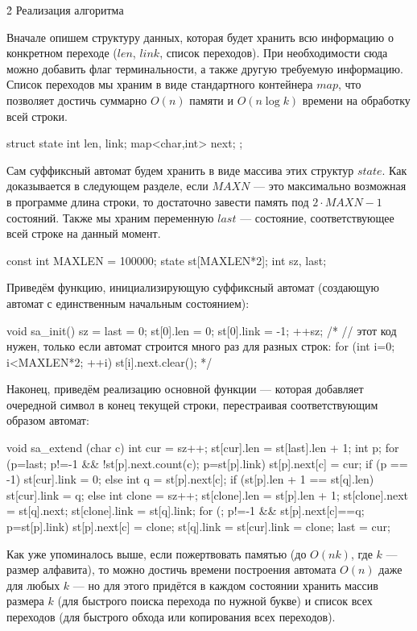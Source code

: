 \h2{ Реализация алгоритма }

Вначале опишем структуру данных, которая будет хранить всю информацию о конкретном переходе ($len$, $link$, список переходов). При необходимости сюда можно добавить флаг терминальности, а также другую требуемую информацию. Список переходов мы храним в виде стандартного контейнера $map$, что позволяет достичь суммарно $O(n)$ памяти и $O (n \log k)$ времени на обработку всей строки.

\code
struct state {
	int len, link;
	map<char,int> next;
};
\endcode

Сам суффиксный автомат будем хранить в виде массива этих структур $state$. Как доказывается в следующем разделе, если $MAXN$ --- это максимально возможная в программе длина строки, то достаточно завести память под $2 \cdot MAXN - 1$ состояний. Также мы храним переменную $last$ --- состояние, соответствующее всей строке на данный момент.

\code
const int MAXLEN = 100000;
state st[MAXLEN*2];
int sz, last;
\endcode

Приведём функцию, инициализирующую суффиксный автомат (создающую автомат с единственным начальным состоянием):

\code
void sa_init() {
	sz = last = 0;
	st[0].len = 0;
	st[0].link = -1;
	++sz;
	/*
	// этот код нужен, только если автомат строится много раз для разных строк:
	for (int i=0; i<MAXLEN*2; ++i)
		st[i].next.clear();
	*/
}
\endcode

Наконец, приведём реализацию основной функции --- которая добавляет очередной символ в конец текущей строки, перестраивая соответствующим образом автомат:

\code
void sa_extend (char c) {
	int cur = sz++;
	st[cur].len = st[last].len + 1;
	int p;
	for (p=last; p!=-1 && !st[p].next.count(c); p=st[p].link)
		st[p].next[c] = cur;
	if (p == -1)
		st[cur].link = 0;
	else {
		int q = st[p].next[c];
		if (st[p].len + 1 == st[q].len)
			st[cur].link = q;
		else {
			int clone = sz++;
			st[clone].len = st[p].len + 1;
			st[clone].next = st[q].next;
			st[clone].link = st[q].link;
			for (; p!=-1 && st[p].next[c]==q; p=st[p].link)
				st[p].next[c] = clone;
			st[q].link = st[cur].link = clone;
		}
	}
	last = cur;
}
\endcode

Как уже упоминалось выше, если пожертвовать памятью (до $O (n k)$, где $k$ --- размер алфавита), то можно достичь времени построения автомата $O (n)$ даже для любых $k$ --- но для этого придётся в каждом состоянии хранить массив размера $k$ (для быстрого поиска перехода по нужной букве) и список всех переходов (для быстрого обхода или копирования всех переходов).



